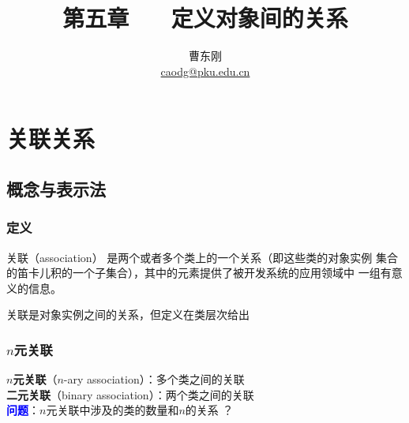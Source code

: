 \documentclass[compress]{beamer}
\begin{document}

					
\title{第五章 ~~ 定义对象间的关系 \MakeUppercase{}}

\author[面向对象的分析与设计]
{曹东刚\\\href{mailto:caodg@pku.edu.cn}{caodg@pku.edu.cn}}


\date{}



\begin{frame}[plain]
	\titlepage
\end{frame}

\setcounter{framenumber}{0}

\section{关联关系}

\subsection{概念与表示法}

\begin{frame}
  \frametitle{定义}
  \begin{block}{关联（association）}
    是两个或者多个类上的一个关系（即这些类的对象实例
    集合的笛卡儿积的一个子集合），其中的元素提供了被开发系统的应用领域中
    一组有意义的信息。
  \end{block}
  关联是对象实例之间的关系，但定义在类层次给出
\end{frame}

\begin{frame}
  \frametitle{$n$元关联}
  \alert{\textbf{$n$元关联}}（$n$-ary association）：多个类之间的关联 \\ 
  \alert{\textbf{二元关联}}（binary association）：两个类之间的关联
  \\[1cm]

  \textcolor{blue}{\textbf{问题}}：$n$元关联中涉及的类的数量和$n$的关系
  ？

\end{frame}
\end{document}
